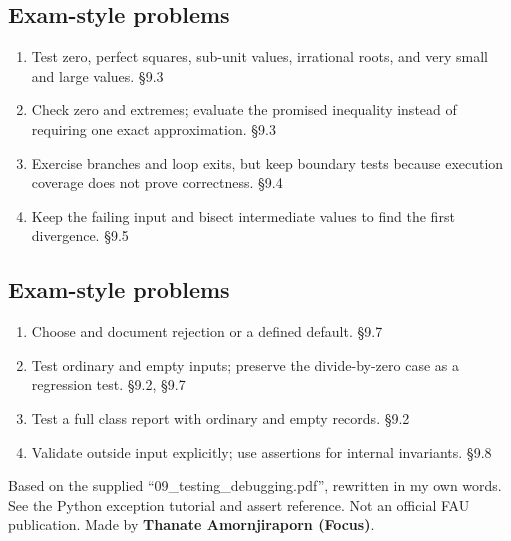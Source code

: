 \documentclass[11pt]{article}
\begin{document}
\begin{keepsection}
\end{keepsection}
\begin{keepsection}\subsection{Exam-style problems}

\begin{enumerate}
\item Test zero, perfect squares, sub-unit values, irrational roots, and very small and large values. \hfill{\small\color{FAUblue}§9.3}
\item Check zero and extremes; evaluate the promised inequality instead of requiring one exact approximation. \hfill{\small\color{FAUblue}§9.3}
\item Exercise branches and loop exits, but keep boundary tests because execution coverage does not prove correctness. \hfill{\small\color{FAUblue}§9.4}
\item Keep the failing input and bisect intermediate values to find the first divergence. \hfill{\small\color{FAUblue}§9.5}
\end{enumerate}

\end{keepsection}
\begin{keepsection}\subsection{Exam-style problems}

\begin{enumerate}
\item Choose and document rejection or a defined default. \hfill{\small\color{FAUblue}§9.7}
\item Test ordinary and empty inputs; preserve the divide-by-zero case as a regression test. \hfill{\small\color{FAUblue}§9.2, §9.7}
\item Test a full class report with ordinary and empty records. \hfill{\small\color{FAUblue}§9.2}
\item Validate outside input explicitly; use assertions for internal invariants. \hfill{\small\color{FAUblue}§9.8}
\end{enumerate}

\end{keepsection}

\vfill{\small Based on the supplied “09\_testing\_debugging.pdf”, rewritten in my own words. See the Python exception tutorial and assert reference. Not an official FAU publication. Made by \textbf{Thanate Amornjiraporn (Focus)}.}
\end{document}
